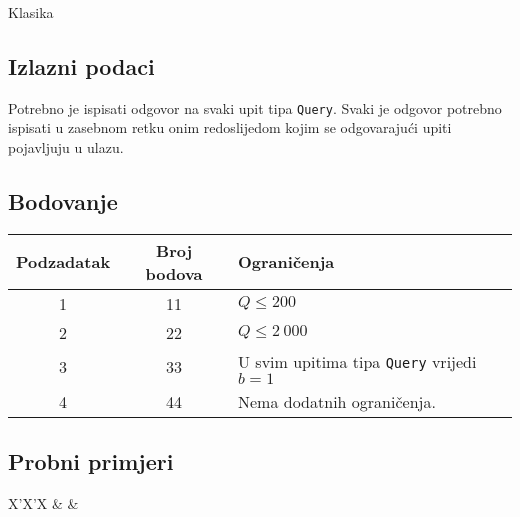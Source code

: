 \begin{statement}[
  problempoints=110,
  timelimit=1 sekunda,
  memorylimit=512 MiB,
]{Klasika}
\subsection*{Izlazni podaci}
Potrebno je ispisati odgovor na svaki upit tipa \texttt{Query}. Svaki je
odgovor potrebno ispisati u zasebnom retku onim redoslijedom kojim se
odgovarajući upiti pojavljuju u ulazu.

 \subsection*{Bodovanje}
{\renewcommand{\arraystretch}{1.4}
  \setlength{\tabcolsep}{6pt}
  \begin{tabular}{ccl}
 Podzadatak & Broj bodova & Ograničenja \\ \midrule
  1 & 11 & $Q \le 200$ \\
  2 & 22 & $Q \le 2\ 000$ \\
  3 & 33 & U svim upitima tipa \texttt{Query} vrijedi $b=1$ \\
  4 & 44 & Nema dodatnih ograničenja.
\end{tabular}}

\subsection*{Probni primjeri}
\begin{tabularx}{\textwidth}{X'X'X}
 &
 &
\end{tabularx}

\end{statement}

